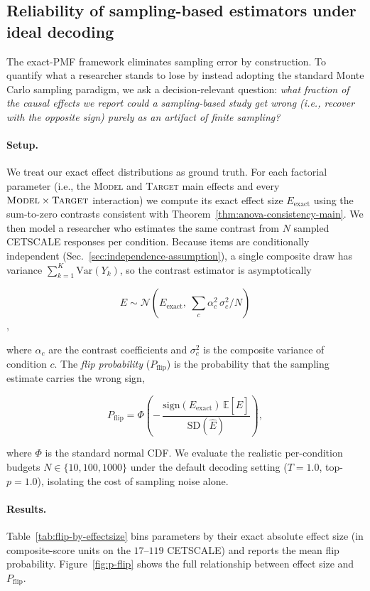 \subsection{Reliability of sampling-based estimators under ideal decoding}
\label{app:flip-analysis}


The exact-PMF framework eliminates sampling error by construction. 
To quantify what a researcher stands to lose by instead adopting the standard Monte Carlo
sampling paradigm, we ask a decision-relevant question: 
\emph{what fraction of the causal effects we report could a sampling-based study
get wrong (i.e., recover with the opposite sign) purely as an artifact of finite
sampling?}

\paragraph{Setup.}
We treat our exact effect distributions as ground truth. 
For each factorial parameter (i.e., the \textsc{Model} and \textsc{Target} main effects and every
$\textsc{Model}\times\textsc{Target}$ interaction) we compute its exact effect size $E_{\text{exact}}$ 
using the sum-to-zero contrasts consistent with
Theorem~\ref{thm:anova-consistency-main}. 
We then model a researcher who estimates the same contrast from $N$ sampled CETSCALE responses per condition.
Because items are conditionally independent (Sec.~\ref{sec:independence-assumption}),
a single composite draw has variance $\sum_{k=1}^{K}\mathrm{Var}(Y_{k})$, 
so the contrast estimator is asymptotically

$$\hat{E}\sim\mathcal{N}\!\left(E_{\text{exact}},\ \sum_{c}\alpha_c^2\,
\sigma_c^2/N\right)$$,

where $\alpha_c$ are the contrast coefficients 
and $\sigma_c^2$ is the composite variance of condition $c$. 
The \emph{flip probability} ($P_{\text{flip}}$) is the probability that the sampling estimate carries the wrong sign,

\begin{equation}
\label{eq:flip-prob}
P_{\text{flip}}
=
\Phi\!\left(
-\,\frac{\mathrm{sign}(E_{\text{exact}})\,\mathbb{E}[\hat{E}]}
{\mathrm{SD}(\hat{E})}
\right),
\end{equation}

where $\Phi$ is the standard normal CDF. 
We evaluate the realistic per-condition budgets $N\in\{10,100,1000\}$ under the default decoding setting
($T{=}1.0$, top-$p{=}1.0$), isolating the cost of sampling noise alone.

\paragraph{Results.}
Table~\ref{tab:flip-by-effectsize} bins parameters by their exact absolute effect
size (in composite-score units on the $17$--$119$ CETSCALE) and reports the mean flip probability. 
Figure~\ref{fig:p-flip} shows the full relationship between
effect size and $P_{\text{flip}}$.

